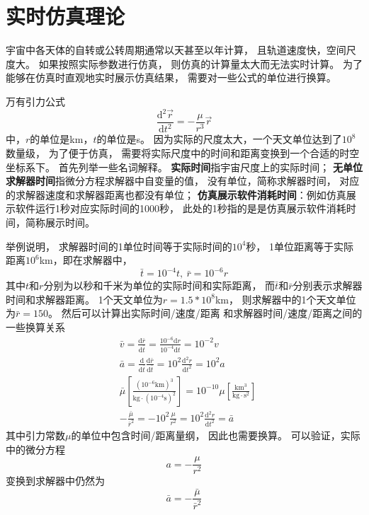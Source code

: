 \section{实时仿真理论}
宇宙中各天体的自转或公转周期通常以天甚至以年计算，
且轨道速度快，空间尺度大。
如果按照实际参数进行仿真，
则仿真的计算量太大而无法实时计算。
为了能够在仿真时直观地实时展示仿真结果，
需要对一些公式的单位进行换算。

万有引力公式
\begin{equation}
    \frac{\text{d}^2\vec{r}}{\text{d}t^2}=-\frac{\mu}{r^3}\vec{r} \label{eqRealGravity}
\end{equation}
中，$r$的单位是km，$t$的单位是s。
因为实际的尺度太大，一个天文单位达到了$10^8$数量级，
为了便于仿真，
需要将实际尺度中的时间和距离变换到一个合适的时空坐标系下。
首先列举一些名词解释。
\textbf{实际时间}指宇宙尺度上的实际时间；
\textbf{无单位求解器时间}指微分方程求解器中自变量的值，
没有单位，简称求解器时间，
对应的求解器速度和求解器距离也都没有单位；
\textbf{仿真展示软件消耗时间}：例如仿真展示软件运行1秒对应实际时间的1000秒，
此处的1秒指的是是仿真展示软件消耗时间，简称展示时间。

举例说明，
求解器时间的1单位时间等于实际时间的$10^4$秒，
1单位距离等于实际距离$10^6$km，即在求解器中，
\begin{equation}
    \bar{t}=10^{-4}t,\ \bar{r}=10^{-6}r \label{eqRealConvert}
\end{equation}
其中$t$和$r$分别为以秒和千米为单位的实际时间和实际距离，
而$\bar{t}$和$\bar{r}$分别表示求解器时间和求解器距离。
1个天文单位为$r=1.5*10^8$km，
则求解器中的1个天文单位为$\bar{r}=150$。
然后可以计算出实际时间/速度/距离
和求解器时间/速度/距离之间的一些换算关系
\begin{align*}
&\bar{v} = \frac{\text{d}\bar{r}}{\text{d}\bar{t}}
 = \frac{10^{-6}\text{d}r}{10^{-4}\text{d}t} = 10^{-2}v \\
&\bar{a} = \frac{\text{d}}{\text{d}\bar{t}}\frac{\text{d}\bar{r}}{\text{d}\bar{t}}
 = 10^2\frac{\text{d}^2r}{\text{d}t^2} = 10^2a \\
&\bar{\mu}\left[\frac{(10^{-6}\text{km})^3}{\text{kg}\cdot(10^{-4}\text{s})^2}\right]
 = 10^{-10}\mu\left[\frac{\text{km}^3}{\text{kg}\cdot \text{s}^2}\right] \\
&-\frac{\bar{\mu}}{\bar{r}^2} = -10^2\frac{\mu}{r^2}
 = 10^2\frac{\text{d}^2r}{\text{d}t^2} = \bar{a}
\end{align*}
其中引力常数$\mu$的单位中包含时间/距离量纲，
因此也需要换算。
可以验证，实际中的微分方程
$$a=-\frac{\mu}{r^2}$$
变换到求解器中仍然为
$$\bar{a}=-\frac{\bar{\mu}}{\bar{r}^2}$$

